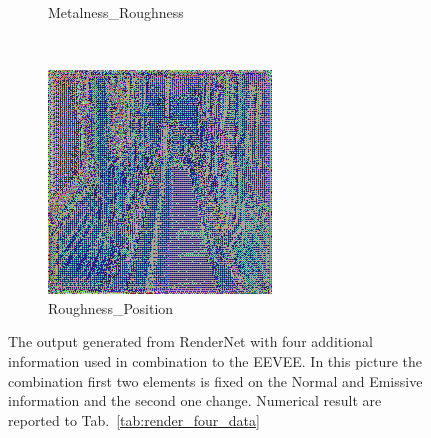 \begin{figure}[h!]
\begin{subfigure}[b]{0.175\textwidth}
     \caption{Metalness_Roughness}
    \end{subfigure}
    ~
    \begin{subfigure}[b]{0.175\textwidth}
     \includegraphics[width=\textwidth]{figures/result/quadruple/normal_emissive_roughness_position/2.png}
     \caption{Roughness_Position}
    \end{subfigure}
    \caption{The output generated from RenderNet with four additional information used in combination to the EEVEE. In this picture the combination first two elements is fixed on the Normal and Emissive information and the second one change. Numerical result are reported to Tab.~\ref{tab:render_four_data}}
    \label{fig:quadruple_input_base_normal_emissive}
\end{figure}

